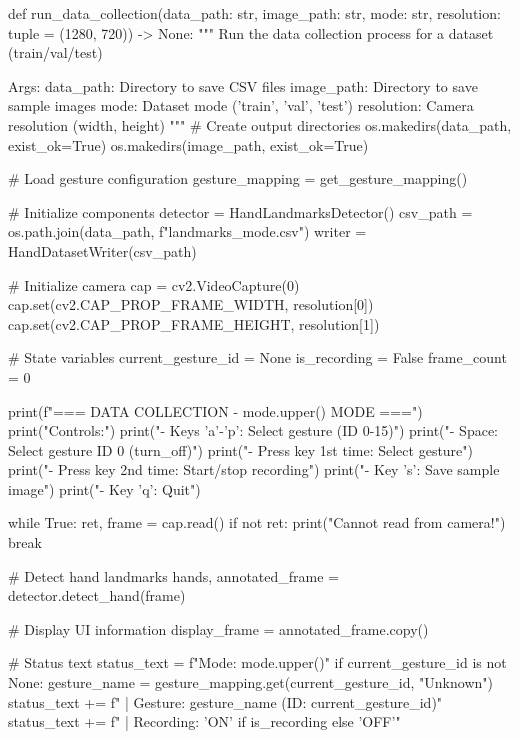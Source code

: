 \begin{aivncodebox}
\begin{python}
def run_data_collection(data_path: str, image_path: str, mode: str, 
                       resolution: tuple = (1280, 720)) -> None:
    """
    Run the data collection process for a dataset (train/val/test)
    
    Args:
        data_path: Directory to save CSV files
        image_path: Directory to save sample images  
        mode: Dataset mode ('train', 'val', 'test')
        resolution: Camera resolution (width, height)
    """
    # Create output directories
    os.makedirs(data_path, exist_ok=True)
    os.makedirs(image_path, exist_ok=True)
    
    # Load gesture configuration
    gesture_mapping = get_gesture_mapping()
    
    # Initialize components
    detector = HandLandmarksDetector()
    csv_path = os.path.join(data_path, f"landmarks_{mode}.csv")
    writer = HandDatasetWriter(csv_path)
    
    # Initialize camera
    cap = cv2.VideoCapture(0)
    cap.set(cv2.CAP_PROP_FRAME_WIDTH, resolution[0])
    cap.set(cv2.CAP_PROP_FRAME_HEIGHT, resolution[1])
    
    # State variables
    current_gesture_id = None
    is_recording = False
    frame_count = 0
    
    print(f"=== DATA COLLECTION - {mode.upper()} MODE ===")
    print("Controls:")
    print("- Keys 'a'-'p': Select gesture (ID 0-15)")
    print("- Space: Select gesture ID 0 (turn_off)")  
    print("- Press key 1st time: Select gesture")
    print("- Press key 2nd time: Start/stop recording")
    print("- Key 's': Save sample image")
    print("- Key 'q': Quit")
    
    while True:
        ret, frame = cap.read()
        if not ret:
            print("Cannot read from camera!")
            break
        
        # Detect hand landmarks
        hands, annotated_frame = detector.detect_hand(frame)
        
        # Display UI information
        display_frame = annotated_frame.copy()
        
        # Status text
        status_text = f"Mode: {mode.upper()}"
        if current_gesture_id is not None:
            gesture_name = gesture_mapping.get(current_gesture_id, "Unknown")
            status_text += f" | Gesture: {gesture_name} (ID: {current_gesture_id})"
        status_text += f" | Recording: {'ON' if is_recording else 'OFF'}"
        

\end{python}
\end{aivncodebox}
